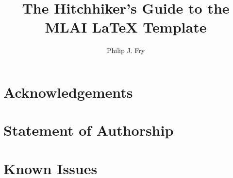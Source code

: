 \documentclass[ba,logo]{mlai-thesis}
\title{The Hitchhiker's Guide to the MLAI \LaTeX{} Template}
\author{Philip J. Fry\\\birthinfo{August 14, 1974 in Brooklyn, New York}}
\begin{document}
	
	\frontmatter 
	
	\maketitle 
	
	\cleardoublepage
	\begin{abstract}
		\blindtext[3]
	\end{abstract}

	\chapter*{Acknowledgements}  
	
	\cleardoublepage
	\chapter*{Statement of Authorship} 
	 
	
	\cleardoublepage
	\tableofcontents
	
	
	\mainmatter
	
	 
	
	
	
	 
	
	
	
	 
	
	 
	
	\begingroup 
	
	\backmatter
		
	\printbibliography[heading=bibintoc]
	
	\listoffigures
	
	\listoftables
	
	\endgroup 
	
	\appendix
	
	\chapter{Known Issues}  
	
\end{document}
